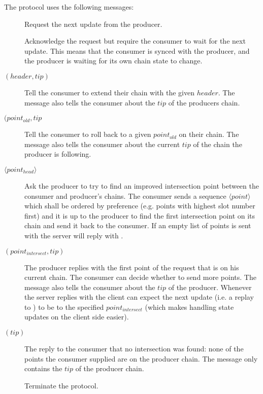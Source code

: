 The protocol uses the following messages:
\begin{description}
\item [\MsgRequestNext]
      Request the next update from the producer.
\item [\MsgAwaitReply]
      Acknowledge the request but require the consumer to wait for the next update.
      This means that the consumer is synced with the producer, and
      the producer is waiting for its own chain state to change.
\item [\MsgRollForward{} {\boldmath $(header, tip)$}]
      Tell the consumer to extend their chain with the given $header$.
      The message also tells the consumer about the $tip$ of the producers chain.
\item [\MsgRollBackward{} {\boldmath $(point_{old}, tip$}]
      Tell the consumer to roll back to a given $point_{old}$ on their chain.
      The message also tells the consumer about the current  $tip$ of the chain the producer is following.
\item [\MsgFindIntersect{} {\boldmath $\langle point_{head} \rangle $}]
      Ask the producer to try to find an improved intersection point between
      the consumer and producer's chains.
      The consumer sends a sequence {\boldmath $\langle point \rangle $} which
      shall be ordered by preference (e.g. points with highest slot number
      first) and it is up to the producer to find the first intersection point
      on its chain and send it back to the consumer.  If an empty list of
      points is sent with \MsgFindIntersect{} the server will reply with
      \MsgIntersectNotFound{}.
\item [\MsgIntersectFound{} {\boldmath $(point_{intersect} ,tip)$}]
      The producer replies with the first point of the request that is on his current chain.
      The consumer can decide whether to send more points.
      The message also tells the consumer about the $tip$ of the producer.
      Whenever the server replies with \MsgIntersectFound{} the client can
      expect the next update (i.e. a replay to \MsgRequestNext{}) to be
      \MsgRollBackward{} to the specified $point_{intersect}$ (which makes
      handling state updates on the client side easier).
\item [\MsgIntersectNotFound{} {\boldmath $(tip)$}]
      The reply to the consumer that no intersection was found: none of the
      points the consumer supplied are on the producer chain.
      The message only contains the $tip$ of the producer chain.
\item [\MsgDone]
      Terminate the protocol.
\end{description}

